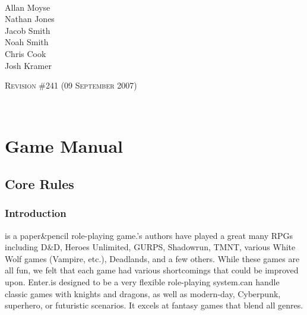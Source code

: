 \documentclass[twoside]{book}
\begin{document}
\begin{titlepage}
~\\~\\~\\~\\~\\~\\~\\~\\~\\~\\
\begin{center}
\ARPG \\

\hspace*{6em}
\vbox{\vspace{-2em}
\small Allan Moyse \\
Nathan Jones \\
Jacob Smith \\
Noah Smith \\
Chris Cook \\
Josh Kramer}

\vskip 2in
\textsc{Revision \#241 (09 September 2007)}
\end{center}

\end{titlepage}

~
\setcounter{page}{1}
\setcounter{tocdepth}{3}
\tableofcontents
\newpage
\listoftables
\newpage
\listoffigures
\newpage
{}
\setcounter{page}{1}


  
    

\part{Game Manual}
    
    

\chapter{Core Rules}
    
    

\section{Introduction}
    
    {  
    \APATHY{}is a paper\&pencil role-playing game.\APATHY{}'s authors have played a great many RPGs including D\&D, Heroes Unlimited, GURPS, Shadowrun, TMNT, various White Wolf games (Vampire, etc.), Deadlands, and a few others. While these games are all fun, we felt that each game had various shortcomings that could be improved upon. Enter\APATHY{}.\APATHY{}is designed to be a very flexible role-playing system.\APATHY{}can handle classic games with knights and dragons, as well as modern-day, Cyberpunk, superhero, or futuristic scenarios. It excels at fantasy games that blend all genres.
    }
  
\end{document}
